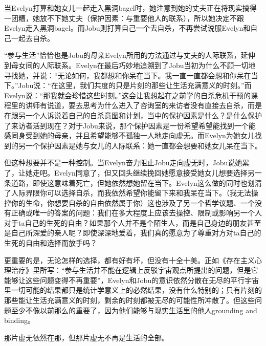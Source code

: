 当Evelyn打算和她女儿一起走入黑洞bagel时，她注意到她的丈夫正在将现实搞得一团糟，她放不下她丈夫（保护因素：与重要他人的联系），所以她决定不跟Evelyn走入黑洞bagel。而Jobu则打算自己一个去自杀，不再尝试说服Evelyn和自己一起去自杀。

“参与生活”恰恰也是Jobu的母亲Evelyn所用的方法\pozhehao{}通过与丈夫的人际联系，延伸到母女间的人际联系。Evelyn在最后巧妙地追溯到了Jobu当初为什么不顾一切地寻找她，并说：“无论如何，我都想和你呆在当下。我一直一直都会想和你呆在当下。”Jobu说：“在这里，我们共度的只是片刻的那些让生活充满意义的时刻。”而Evelyn说：“那我就会珍惜这些时刻。”这会让我想起在之前学的自杀危机干预的课程里的讲师有说道，要去思考为什么进入了咨询室的来访者没有直接去自杀，而是在跟另一个人诉说着自己的自杀意图和计划，当中的保护因素是什么？是什么保护了来访者活到现在？对于Jobu来说，那个保护因素是一份希望\pozhehao{}希望能找到一个能感同身受到她的母亲，并且希望能够不孤独一人地走向虚无。而Evelyn为她女儿找到的另一个保护因素是她与女儿的人际联系：她一直都会想要和她女儿呆在当下。

但这种想要并不是一种控制。当Evelyn奋力阻止Jobu走向虚无时，Jobu说她累了，让她走吧。Evelyn同意了，但又回头继续挽回\pozhehao{}她愿意接受她女儿想要选择另一条道路，即使这意味着死亡，但她依然想她留在当下。Evelyn这么做的同时也划清了人际界限\pozhehao{}你可以选择自杀，而我依然希望你能留下来和我呆在当下。（我无法操控你的生命，你想要自杀的自由依然属于你）这也涉及了另一个哲学议题、一个没有正确或唯一的答案的问题：我们在多大程度上应该去操控、限制或影响另一个人对于ta自己的生死的自由？如果那个人并不是个陌生人，而是自己身边的朋友甚至是自己所深爱的亲人呢？即使深深地爱着，我们真的愿意为了尊重对方对ta自己的生死的自由和选择而放手吗？

更重要的是，无论怎样的选择，都有好有坏，但没有十全十美。正如《存在主义心理治疗》里所写：“参与生活并不能在逻辑上反驳宇宙观点所提出的问题，但是它能够让这些问题变得不再重要”，Evelyn和Jobu的意识依然分散在无尽的平行宇宙里\pozhehao{}一切可能的结果都只是统计学意义上的必然结果，没有什么特别的；只有片刻的那些能让生活充满意义的时刻，剩余的时刻都被无尽的可能性所冲散了。但这些问题至少不像以前那么的重要了，因为他们能够与现实生活里的他人grounding and binding。

那片虚无依然在那，但那片虚无不再是生活的全部。

